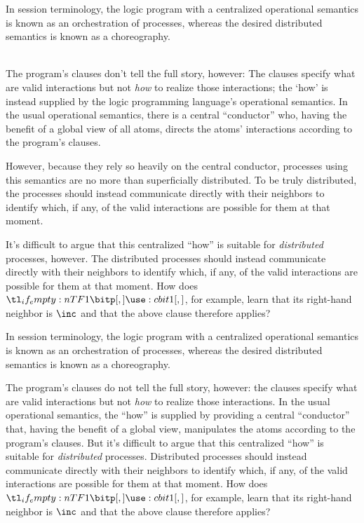 In session terminology, the logic program with a centralized operational semantics is known as an orchestration of processes, whereas the desired distributed semantics is known as a choreography.




\mbox{}\\

The program's clauses don't tell the full story, however:
The clauses specify what are valid interactions but not \emph{how} to realize those interactions; the \enquote*{how} is instead supplied by the logic programming language's operational semantics.
In the usual operational semantics, there is a central \enquote{conductor} who, having the benefit of a global view of all atoms, directs the atoms' interactions according to the program's clauses.

However, because they rely so heavily on the central conductor, processes using this semantics are no more than superficially distributed.
To be truly distributed, the processes should instead communicate directly with their neighbors to identify which, if any, of the valid interactions are possible for them at that moment.

It's difficult to argue that this centralized \enquote{how} is suitable for \emph{distributed} processes, however.
The distributed processes should instead communicate directly with their neighbors to identify which, if any, of the valid interactions are possible for them at that moment.
How does $\bit{1}$, for example, learn that its right-hand neighbor is $\inc$ and that the above clause therefore applies?

In session terminology, the logic program with a centralized operational semantics is known as an orchestration of processes, whereas the desired distributed semantics is known as a choreography.




The program's clauses do not tell the full story, however: the clauses specify what are valid interactions but not \emph{how} to realize those interactions.
In the usual operational semantics, the \enquote{how} is supplied by providing a central \enquote{conductor} that, having the benefit of a global view, manipulates the atoms according to the program's clauses.
But it's difficult to argue that this centralized \enquote{how} is suitable for \emph{distributed} processes.
Distributed processes should instead communicate directly with their neighbors to identify which, if any, of the valid interactions are possible for them at that moment.
How does $\bit{1}$, for example, learn that its right-hand neighbor is $\inc$ and that the above clause therefore applies?






